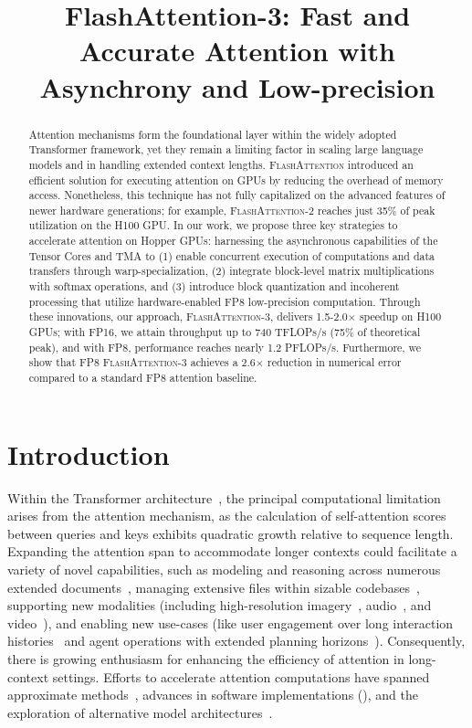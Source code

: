 \title{FlashAttention-3: Fast and Accurate Attention with Asynchrony and Low-precision}

\begin{abstract}
Attention mechanisms form the foundational layer within the widely adopted Transformer framework, yet they remain a limiting factor in scaling large language models and in handling extended context lengths. \textsc{FlashAttention} introduced an efficient solution for executing attention on GPUs by reducing the overhead of memory access. Nonetheless, this technique has not fully capitalized on the advanced features of newer hardware generations; for example, \textsc{FlashAttention-2} reaches just 35\% of peak utilization on the H100 GPU. In our work, we propose three key strategies to accelerate attention on Hopper GPUs: harnessing the asynchronous capabilities of the Tensor Cores and TMA to (1) enable concurrent execution of computations and data transfers through warp-specialization, (2) integrate block-level matrix multiplications with softmax operations, and (3) introduce block quantization and incoherent processing that utilize hardware-enabled FP8 low-precision computation. Through these innovations, our approach, \textsc{FlashAttention-3}, delivers 1.5-2.0$\times$ speedup on H100 GPUs; with FP16, we attain throughput up to 740 TFLOPs/s (75\% of theoretical peak), and with FP8, performance reaches nearly 1.2 PFLOPs/s. Furthermore, we show that FP8 \textsc{FlashAttention-3} achieves a 2.6$\times$ reduction in numerical error compared to a standard FP8 attention baseline.
\end{abstract}

\section{Introduction}
\label{sec:intro}

Within the Transformer architecture~\citep{vaswani2017attention}, the principal computational limitation arises from the attention mechanism, as the calculation of self-attention scores between queries and keys exhibits quadratic growth relative to sequence length. Expanding the attention span to accommodate longer contexts could facilitate a variety of novel capabilities, such as modeling and reasoning across numerous extended documents~\citep{guo2021longt5,shaham2022scrolls,peng2023yarn}, managing extensive files within sizable codebases~\citep{roziere2023code, li2023starcoder}, supporting new modalities (including high-resolution imagery~\citep{chen2022scaling}, audio~\citep{gulati2020conformer}, and video~\citep{ho2022video}), and enabling new use-cases (like user engagement over long interaction histories~\citep{sun2019bert4rec} and agent operations with extended planning horizons~\citep{yao2022react}). Consequently, there is growing enthusiasm for enhancing the efficiency of attention in long-context settings. Efforts to accelerate attention computations have spanned approximate methods~\citep{katharopoulos2020transformers,choromanski2020rethinking, tay2020efficient}, advances in software implementations (\citep{rabe2021self,dao2022flashattention,kwon2023efficient}), and the exploration of alternative model architectures~\citep{peng2023rwkv,sun2023retentive,gu2023mamba}.


